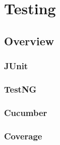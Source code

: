 \part{Testing}


\chapter{Overview}



\section{JUnit}



\section{TestNG}



\section{Cucumber}



\section{Coverage}



